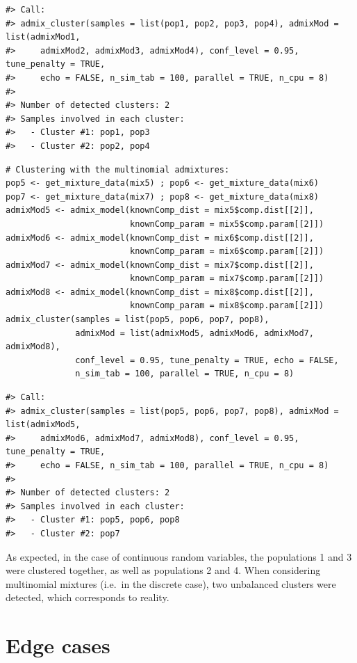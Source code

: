 \begin{verbatim}
#> Call:
#> admix_cluster(samples = list(pop1, pop2, pop3, pop4), admixMod = list(admixMod1, 
#>     admixMod2, admixMod3, admixMod4), conf_level = 0.95, tune_penalty = TRUE, 
#>     echo = FALSE, n_sim_tab = 100, parallel = TRUE, n_cpu = 8)
#> 
#> Number of detected clusters: 2 
#> Samples involved in each cluster:
#>   - Cluster #1: pop1, pop3 
#>   - Cluster #2: pop2, pop4
\end{verbatim}

\begin{verbatim}
# Clustering with the multinomial admixtures:
pop5 <- get_mixture_data(mix5) ; pop6 <- get_mixture_data(mix6)
pop7 <- get_mixture_data(mix7) ; pop8 <- get_mixture_data(mix8)
admixMod5 <- admix_model(knownComp_dist = mix5$comp.dist[[2]],
                         knownComp_param = mix5$comp.param[[2]])
admixMod6 <- admix_model(knownComp_dist = mix6$comp.dist[[2]],
                         knownComp_param = mix6$comp.param[[2]])
admixMod7 <- admix_model(knownComp_dist = mix7$comp.dist[[2]],
                         knownComp_param = mix7$comp.param[[2]])
admixMod8 <- admix_model(knownComp_dist = mix8$comp.dist[[2]],
                         knownComp_param = mix8$comp.param[[2]])
admix_cluster(samples = list(pop5, pop6, pop7, pop8), 
              admixMod = list(admixMod5, admixMod6, admixMod7, admixMod8), 
              conf_level = 0.95, tune_penalty = TRUE, echo = FALSE, 
              n_sim_tab = 100, parallel = TRUE, n_cpu = 8)
\end{verbatim}

\begin{verbatim}
#> Call:
#> admix_cluster(samples = list(pop5, pop6, pop7, pop8), admixMod = list(admixMod5, 
#>     admixMod6, admixMod7, admixMod8), conf_level = 0.95, tune_penalty = TRUE, 
#>     echo = FALSE, n_sim_tab = 100, parallel = TRUE, n_cpu = 8)
#> 
#> Number of detected clusters: 2 
#> Samples involved in each cluster:
#>   - Cluster #1: pop5, pop6, pop8 
#>   - Cluster #2: pop7
\end{verbatim}

As expected, in the case of continuous random variables, the populations 1 and 3 were clustered together, as well as populations 2 and 4. When considering multinomial mixtures (i.e.~in the discrete case), two unbalanced clusters were detected, which corresponds to reality.

\section{Edge cases}\label{edge-cases}

